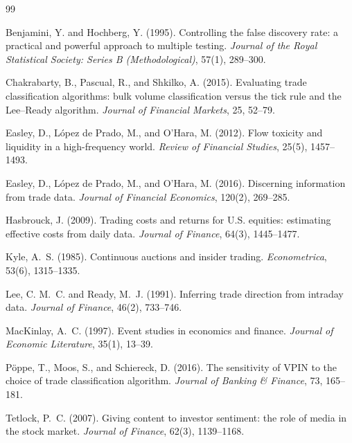 \documentclass[11pt,a4paper]{article}
\begin{document}
\renewcommand{\refname}{References}
\begin{thebibliography}{99}

Benjamini, Y. and Hochberg, Y. (1995).
Controlling the false discovery rate: a practical and powerful approach to multiple testing.
\emph{Journal of the Royal Statistical Society: Series B (Methodological)}, 57(1), 289--300.

Chakrabarty, B., Pascual, R., and Shkilko, A. (2015).
Evaluating trade classification algorithms: bulk volume classification versus the tick rule and the Lee--Ready algorithm.
\emph{Journal of Financial Markets}, 25, 52--79.

Easley, D., L\'opez de Prado, M., and O'Hara, M. (2012).
Flow toxicity and liquidity in a high-frequency world.
\emph{Review of Financial Studies}, 25(5), 1457--1493.

Easley, D., L\'opez de Prado, M., and O'Hara, M. (2016).
Discerning information from trade data.
\emph{Journal of Financial Economics}, 120(2), 269--285.

Hasbrouck, J. (2009).
Trading costs and returns for U.S. equities: estimating effective costs from daily data.
\emph{Journal of Finance}, 64(3), 1445--1477.

Kyle, A.~S. (1985).
Continuous auctions and insider trading.
\emph{Econometrica}, 53(6), 1315--1335.

Lee, C. M.~C. and Ready, M.~J. (1991).
Inferring trade direction from intraday data.
\emph{Journal of Finance}, 46(2), 733--746.

MacKinlay, A.~C. (1997).
Event studies in economics and finance.
\emph{Journal of Economic Literature}, 35(1), 13--39.

P\"oppe, T., Moos, S., and Schiereck, D. (2016).
The sensitivity of VPIN to the choice of trade classification algorithm.
\emph{Journal of Banking \& Finance}, 73, 165--181.

Tetlock, P.~C. (2007).
Giving content to investor sentiment: the role of media in the stock market.
\emph{Journal of Finance}, 62(3), 1139--1168.

\end{thebibliography}
\end{document}
